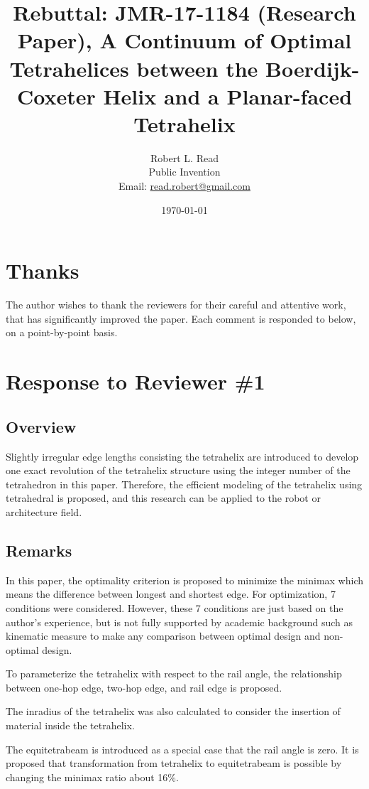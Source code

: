 \documentclass{article}
\title{Rebuttal: JMR-17-1184 (Research Paper), A Continuum of Optimal Tetrahelices between the Boerdijk-Coxeter Helix and a Planar-faced Tetrahelix}
\author{Robert L. Read \\
  Public Invention \\
    Email: \href{mailto:read.robert@gmail.com}{read.robert@gmail.com}   
	}
\date{\today}
\begin{document}
\maketitle

\section{Thanks}

The author wishes to thank the reviewers for their careful and attentive work, that has
significantly improved the paper. Each comment is responded
to below, on a point-by-point basis.

\section{Response to Reviewer \#1}

\subsection{Overview}

Slightly irregular edge lengths consisting the tetrahelix are introduced to develop one exact
revolution of the tetrahelix structure using the integer number of the tetrahedron in this paper.
Therefore, the efficient modeling of the tetrahelix using tetrahedral is proposed, and this research
can be applied to the robot or architecture field.

\subsection{Remarks}

In this paper, the optimality criterion is proposed to minimize the minimax which means the
difference between longest and shortest edge. For optimization, 7 conditions were considered.
However, these 7 conditions are just based on the author’s experience, but is not fully supported
by academic background such as kinematic measure to make any comparison between optimal
design and non-optimal design.

To parameterize the tetrahelix with respect to the rail angle, the relationship between one-hop edge,
two-hop edge, and rail edge is proposed.

The inradius of the tetrahelix was also calculated to consider the insertion of material inside the
tetrahelix.

The equitetrabeam is introduced as a special case that the rail angle is zero. It is proposed that
transformation from tetrahelix to equitetrabeam is possible by changing the minimax ratio about
16\%.
\end{document}
